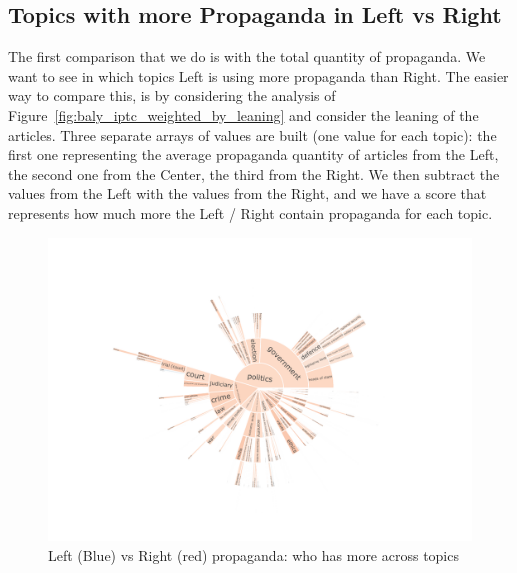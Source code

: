 \subsection{\statusgreen Topics with more Propaganda in Left vs Right}
\label{ssec:topic_propaganda_leaning_tot_quantity}


The first comparison that we do is with the total quantity of propaganda. We want to see in which topics Left is using more propaganda than Right.
The easier way to compare this, is by considering the analysis of Figure~\ref{fig:baly_iptc_weighted_by_leaning} and consider the leaning of the articles. Three separate arrays of values are built (one value for each topic): the first one representing the average propaganda quantity of articles from the Left, the second one from the Center, the third from the Right.
We then subtract the values from the Left with the values from the Right, and we have a score that represents how much more the Left / Right contain propaganda for each topic.



\begin{figure}[!htbp]
    \centering
    \includegraphics[trim={2.2cm 2cm 2.2cm 2cm},clip,width=\linewidth]{figures/baly_iptc_weighted_prop_total_leaning_diff.pdf}
    \caption{Left (Blue) vs Right (red) propaganda: who has more across topics}
    \label{fig:baly_iptc_weighted_prop_total_leaning_diff}
\end{figure}

